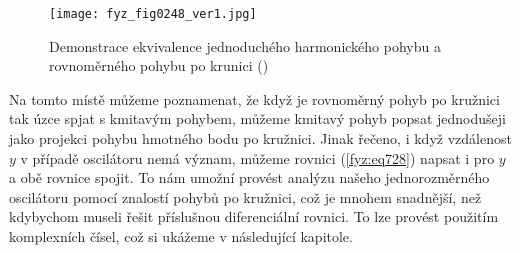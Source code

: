     \begin{figure}[ht!] %
      \centering
      \texttt{[image: fyz\_fig0248\_ver1.jpg]}
      \caption{Demonstrace ekvivalence jednoduchého harmonického pohybu a rovnoměrného pohybu po 
              krunici
              (\cite[s.~290]{Feynman01})}
      \label{fyz:fig0248}
    \end{figure}

    Na tomto místě můžeme poznamenat, že když je rovnoměrný pohyb po kružnici tak úzce spjat s
    kmitavým pohybem, můžeme kmitavý pohyb popsat jednodušeji jako projekci pohybu hmotného bodu po
    kružnici. Jinak řečeno, i když vzdálenost \(y\) v případě oscilátoru nemá význam, můžeme rovnici
    (\ref{fyz:eq728}) napsat i pro \(y\) a obě rovnice spojit. To nám umožní provést analýzu našeho
    jednorozměrného oscilátoru pomocí znalostí pohybů po kružnici, což je mnohem snadnější, než
    kdybychom museli řešit příslušnou diferenciální rovnici. To lze provést použitím komplexních
    čísel, což si ukážeme v následující kapitole.

